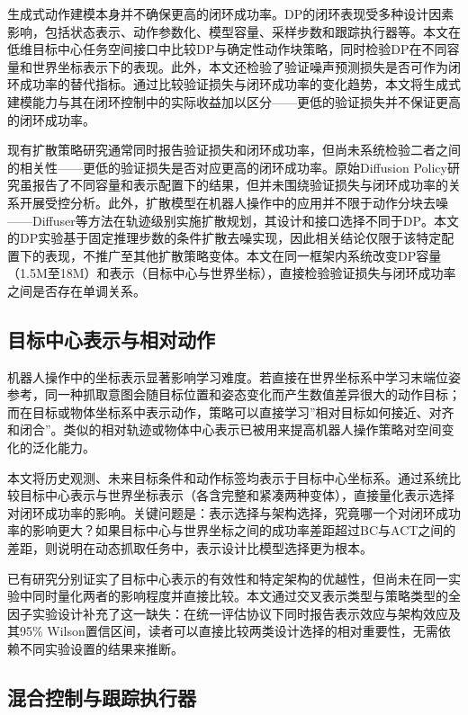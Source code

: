 生成式动作建模本身并不确保更高的闭环成功率。DP的闭环表现受多种设计因素影响，包括状态表示、动作参数化、模型容量、采样步数和跟踪执行器等。本文在低维目标中心任务空间接口中比较DP与确定性动作块策略，同时检验DP在不同容量和世界坐标表示下的表现。此外，本文还检验了验证噪声预测损失是否可作为闭环成功率的替代指标。通过比较验证损失与闭环成功率的变化趋势，本文将生成式建模能力与其在闭环控制中的实际收益加以区分——更低的验证损失并不保证更高的闭环成功率。

现有扩散策略研究通常同时报告验证损失和闭环成功率，但尚未系统检验二者之间的相关性——更低的验证损失是否对应更高的闭环成功率。原始Diffusion Policy研究虽报告了不同容量和表示配置下的结果，但并未围绕验证损失与闭环成功率的关系开展受控分析。此外，扩散模型在机器人操作中的应用并不限于动作分块去噪——Diffuser等方法在轨迹级别实施扩散规划\citep{janner2022diffuser}，其设计和接口选择不同于DP。本文的DP实验基于固定推理步数的条件扩散去噪实现，因此相关结论仅限于该特定配置下的表现，不推广至其他扩散策略变体。本文在同一框架内系统改变DP容量（1.5M至18M）和表示（目标中心与世界坐标），直接检验验证损失与闭环成功率之间是否存在单调关系。

\subsection{目标中心表示与相对动作}

机器人操作中的坐标表示显著影响学习难度。若直接在世界坐标系中学习末端位姿参考，同一种抓取意图会随目标位置和姿态变化而产生数值差异很大的动作目标；而在目标或物体坐标系中表示动作，策略可以直接学习”相对目标如何接近、对齐和闭合”。类似的相对轨迹或物体中心表示已被用来提高机器人操作策略对空间变化的泛化能力\citep{zeng2021transporter,chi2024universal}。

本文将历史观测、未来目标条件和动作标签均表示于目标中心坐标系。通过系统比较目标中心表示与世界坐标表示（各含完整和紧凑两种变体），直接量化表示选择对闭环成功率的影响。关键问题是：表示选择与架构选择，究竟哪一个对闭环成功率的影响更大？如果目标中心与世界坐标之间的成功率差距超过BC与ACT之间的差距，则说明在动态抓取任务中，表示设计比模型选择更为根本。

已有研究分别证实了目标中心表示的有效性和特定架构的优越性，但尚未在同一实验中同时量化两者的影响程度并直接比较。本文通过交叉表示类型与策略类型的全因子实验设计补充了这一缺失：在统一评估协议下同时报告表示效应与架构效应及其95\% Wilson置信区间，读者可以直接比较两类设计选择的相对重要性，无需依赖不同实验设置的结果来推断。

\subsection{混合控制与跟踪执行器}

